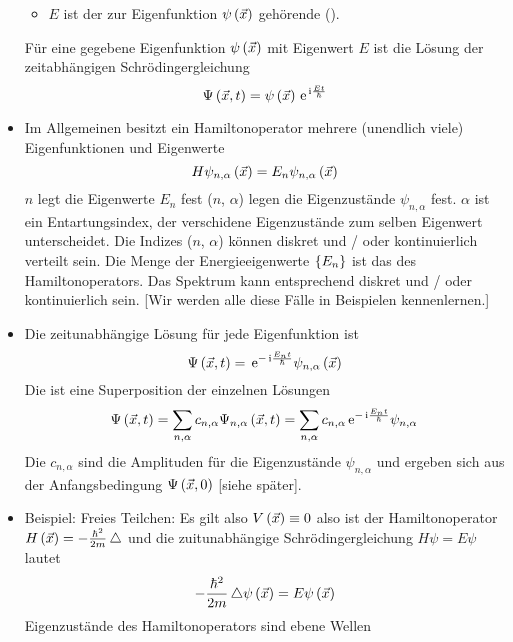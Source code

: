 \begin{itemize}
\begin{itemize}
		\item $E$ ist der zur Eigenfunktion $\psi\left(\vec{x}\right)$ gehörende  ().
	\end{itemize}
	Für eine gegebene Eigenfunktion $\psi\left(\vec{x}\right)$ mit Eigenwert $E$ ist die Lösung der zeitabhängigen Schrö\-dinger\-gleichung
	\begin{equation}
		\Psi\left(\vec{x},t\right) = \psi\left(\vec{x}\right)\, \text{e}^{\, \text{i}\frac{E t}{\hbar}}
	\end{equation}
	\item Im Allgemeinen besitzt ein Hamiltonoperator mehrere (unendlich viele) Eigenfunktionen und Eigenwerte
	\begin{equation}
		H\psi_{n,\alpha}\left(\vec{x}\right) = E_n\psi_{n,\alpha}\left(\vec{x}\right)
	\end{equation}
	$n$ legt die Eigenwerte $E_n$ fest ($n$, $\alpha$) legen die Eigenzustände $\psi_{n,\alpha}$ fest. $\alpha$ ist ein Entartungsindex, der verschidene Eigenzustände zum selben Eigenwert unterscheidet. Die Indizes ($n$, $\alpha$) können diskret und / oder kontinuierlich verteilt sein. Die Menge der Energieeigenwerte $\left\{ E_n \right\}$ ist das  des Hamiltonoperators. Das Spektrum kann entsprechend diskret und / oder kontinuierlich sein. [Wir werden alle diese Fälle in Beispielen kennenlernen.]
	\item Die zeitunabhängige Lösung für jede Eigenfunktion ist
	\begin{equation}
		\Psi\left(\vec{x},t\right) = \, \text{e}^{-\, \text{i}\frac{E_n t}{\hbar}}\psi_{n,\alpha}\left(\vec{x}\right)
	\end{equation}
	Die  ist eine Superposition der einzelnen Lösungen
	\begin{equation}
		\Psi\left(\vec{x},t\right) = \sum\limits_{n,\alpha} c_{n,\alpha} \Psi_{n,\alpha}\left(\vec{x},t\right) = \sum\limits_{n,\alpha} c_{n,\alpha} \, \text{e}^{-\, \text{i}\frac{E_n t}{\hbar}} \psi_{n,\alpha}
	\end{equation}
	Die $c_{n,\alpha}$ sind die Amplituden für die Eigenzustände $\psi_{n,\alpha}$ und ergeben sich aus der Anfangsbedingung $\Psi\left(\vec{x},0\right)$ [siehe später].
	\item Beispiel: Freies Teilchen: Es gilt also $V\left(\vec{x}\right) \equiv 0$ also ist der Hamiltonoperator $H\left(\vec{x}\right) = - \frac{\hbar^2}{2 m} \mathop{}\!\mathbin\bigtriangleup$ und die zuitunabhängige Schrödingergleichung $H\psi = E \psi$ lautet
	\begin{equation}
		-\frac{\hbar^2}{2m}\mathop{}\!\mathbin\bigtriangleup\psi\left(\vec{x}\right) = E \psi\left(\vec{x}\right)
	\end{equation}
	Eigenzustände des Hamiltonoperators sind ebene Wellen

\end{itemize}
